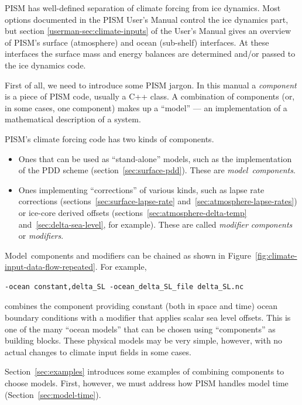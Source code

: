\documentclass[titlepage,letterpaper,final]{scrartcl}
\begin{document}
PISM has well-defined separation of climate forcing
from ice dynamics.  Most options documented in the PISM User's Manual
control the ice dynamics part, but section
\ref*{userman-sec:climate-inputs} of the User's Manual gives an overview
of PISM's surface (atmosphere) and ocean (sub-shelf) interfaces.  At
these interfaces the surface mass and energy balances are determined
and/or passed to the ice dynamics code.

\vspace{0.3in}

First of all, we need to introduce some PISM jargon. In this manual a
\emph{component} is a piece of PISM code, usually a C++ class. A combination of
components (or, in some cases, one component) makes up a ``model'' --- an
implementation of a mathematical description of a system.

PISM's climate forcing code has two kinds of components.
\begin{itemize}
\item Ones that can be used as ``stand-alone'' models, such as the
  implementation of the PDD scheme (section~\ref{sec:surface-pdd}). These are
  \emph{model~components}.
\item Ones implementing ``corrections'' of various kinds, such as lapse rate
  corrections (sections~\ref{sec:surface-lapse-rate}
  and~\ref{sec:atmosphere-lapse-rates}) or ice-core derived offsets
  (sections~\ref{sec:atmosphere-delta-temp} and~\ref{sec:delta-sea-level}, for
  example). These are called \emph{modifier components} or \emph{modifiers}.
\end{itemize}

Model~components and modifiers can be chained as shown in
Figure~\ref{fig:climate-input-data-flow-repeated}. For example,
\begin{verbatim}
-ocean constant,delta_SL -ocean_delta_SL_file delta_SL.nc
\end{verbatim}
combines the component providing constant (both in space and time) ocean
boundary conditions with a modifier that
applies scalar sea level offsets. This is one of the many ``ocean models'' that
can be chosen using ``components'' as building blocks.
These physical models may be very simple, however, with no actual changes to
climate input fields in some cases.

Section~\ref{sec:examples} introduces some examples of combining components to
choose models. First, however, we must address how PISM handles model time
(Section~\ref{sec:model-time}).
\end{document}
